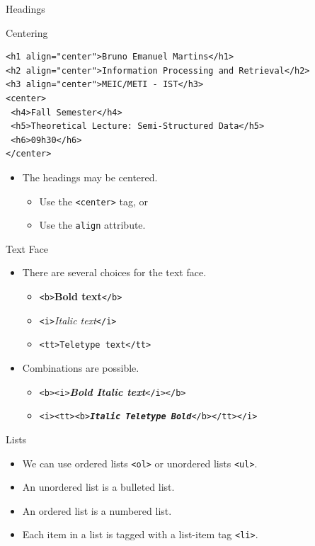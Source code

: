 \documentclass[svgnames]{beamer}
\begin{document}
\begin{frame}[fragile]{Headings}
\small
\begin{block}{Centering}
\scriptsize
\begin{verbatim}
<h1 align="center">Bruno Emanuel Martins</h1>
<h2 align="center">Information Processing and Retrieval</h2>
<h3 align="center">MEIC/METI - IST</h3>
<center>
 <h4>Fall Semester</h4>
 <h5>Theoretical Lecture: Semi-Structured Data</h5>
 <h6>09h30</h6>
</center>
\end{verbatim}
\end{block}
\normalsize
\begin{itemize}
	\item The headings may be centered.
	\begin{itemize}
		\item Use the \texttt{<center>} tag, or
		\item Use the \texttt{align} \alert{attribute}.
	\end{itemize}
\end{itemize}
\end{frame}

\begin{frame}[fragile]{Text Face}
\begin{itemize}
	\item There are several choices for the text face.
	\begin{itemize}
		\item \texttt{<b>}\textbf{Bold text}\texttt{</b>}
		\item \texttt{<i>}{\it Italic text}\texttt{</i>}
		\item \texttt{<tt>}\texttt{Teletype text}\texttt{</tt>}
	\end{itemize}
	\item Combinations are possible.
	\begin{itemize}
		\item \texttt{<b><i>}\textbf{\textit{Bold Italic text}}\texttt{</i></b>}
		\item \texttt{<i><tt><b>}{\it \textbf{\texttt{Italic Teletype Bold}}}\texttt{</b></tt></i>}
	\end{itemize}
\end{itemize}
\end{frame}

\begin{frame}[fragile]{Lists}
\begin{itemize}
	\item We can use ordered lists \texttt{<ol>} or unordered lists \texttt{<ul>}.
	\item An unordered list is a bulleted list.
	\item An ordered list is a numbered list.
	\item Each item in a list is tagged with a list-item tag \texttt{<li>}.
\end{itemize}
\end{frame}
\end{document}
